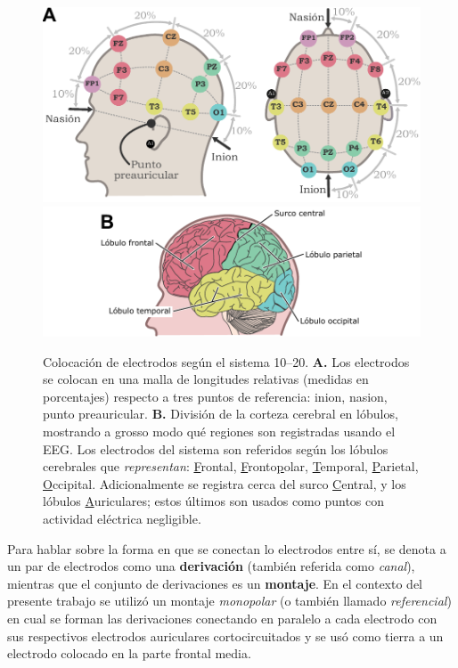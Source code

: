 \documentclass[12pt,letterpaper]{book}
\begin{document}
\begin{figure}
\centering
\includegraphics[width=\linewidth]{./img_diagramas/cabeza_proporcionada_color_v4.pdf} 
\includegraphics[width=\linewidth]{./img_diagramas/cerebro_1020_v5.pdf} 
\caption[Colocación de electrodos según el sistema 10--20]{Colocación de electrodos según el sistema 10--20. \textbf{A.} Los electrodos se colocan en una malla de longitudes relativas (medidas en porcentajes) respecto a tres puntos de referencia: inion, nasion, punto preauricular.
\textbf{B.} División de la corteza cerebral en lóbulos, mostrando a grosso modo qué regiones son registradas usando el EEG. Los electrodos del sistema son referidos según los lóbulos cerebrales que \textit{representan}: \underline{F}rontal, \underline{F}ronto\underline{p}olar, \underline{T}emporal, \underline{P}arietal, \underline{O}ccipital. Adicionalmente se registra cerca del surco \underline{C}entral, y los lóbulos \underline{A}uriculares; estos últimos son usados como puntos con actividad eléctrica negligible.
}
\label{img1020}
\end{figure}

Para hablar sobre la forma en que se conectan lo electrodos entre sí, se denota a un par de electrodos como una \textbf{derivación} (también referida como \textit{canal}), mientras que el conjunto de derivaciones es un \textbf{montaje}.
%
En el contexto del presente trabajo se utilizó un montaje \textit{monopolar} (o también llamado \textit{referencial}) en cual se forman las derivaciones conectando en paralelo a cada electrodo con sus respectivos electrodos auriculares cortocircuitados y se usó como tierra a un electrodo colocado en la parte frontal media.
\end{document}
